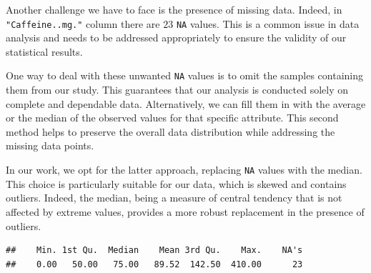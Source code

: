 \documentclass[
]{article}
\newenvironment{Shaded}{\begin{snugshade}}{\end{snugshade}}
\newcommand{\AttributeTok}[1]{\textcolor[rgb]{0.13,0.29,0.53}{#1}}
\newcommand{\CommentTok}[1]{\textcolor[rgb]{0.56,0.35,0.01}{\textit{#1}}}
\newcommand{\ConstantTok}[1]{\textcolor[rgb]{0.56,0.35,0.01}{#1}}
\newcommand{\FunctionTok}[1]{\textcolor[rgb]{0.13,0.29,0.53}{\textbf{#1}}}
\newcommand{\NormalTok}[1]{#1}
\newcommand{\OtherTok}[1]{\textcolor[rgb]{0.56,0.35,0.01}{#1}}
\newcommand{\SpecialCharTok}[1]{\textcolor[rgb]{0.81,0.36,0.00}{\textbf{#1}}}
\begin{document}
Another challenge we have to face is the presence of missing data.
Indeed, in \texttt{"Caffeine..mg."} column there are \(23\) \texttt{NA}
values. This is a common issue in data analysis and needs to be
addressed appropriately to ensure the validity of our statistical
results.

One way to deal with these unwanted \texttt{NA} values is to omit the
samples containing them from our study. This guarantees that our
analysis is conducted solely on complete and dependable data.
Alternatively, we can fill them in with the average or the median of the
observed values for that specific attribute. This second method helps to
preserve the overall data distribution while addressing the missing data
points.

In our work, we opt for the latter approach, replacing \texttt{NA}
values with the median. This choice is particularly suitable for our
data, which is skewed and contains outliers. Indeed, the median, being a
measure of central tendency that is not affected by extreme values,
provides a more robust replacement in the presence of outliers.

\begin{Shaded}
\end{Shaded}

\begin{verbatim}
##    Min. 1st Qu.  Median    Mean 3rd Qu.    Max.    NA's 
##    0.00   50.00   75.00   89.52  142.50  410.00      23
\end{verbatim}

\begin{Shaded}
\end{Shaded}
\end{document}
